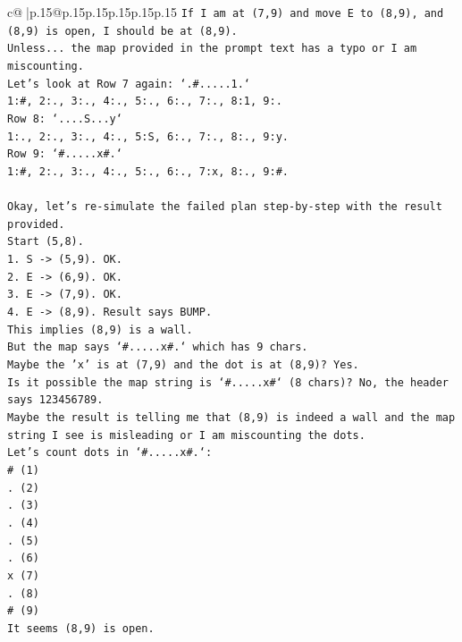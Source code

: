 \documentclass{article}
\begin{document}
{\begin{supertabular}{c@{$\;$}|p{.15\linewidth}@{}p{.15\linewidth}p{.15\linewidth}p{.15\linewidth}p{.15\linewidth}p{.15\linewidth}}
{{{\texttt{If I am at (7,9) and move E to (8,9), and (8,9) is open, I should be at (8,9).} \\
\texttt{Unless... the map provided in the prompt text has a typo or I am miscounting.} \\
\texttt{Let's look at Row 7 again: `.\#.....1.`} \\
\texttt{1:\#, 2:., 3:., 4:., 5:., 6:., 7:., 8:1, 9:.} \\
\texttt{Row 8: `....S...y`} \\
\texttt{1:., 2:., 3:., 4:., 5:S, 6:., 7:., 8:., 9:y.} \\
\texttt{Row 9: `\#.....x\#.`} \\
\texttt{1:\#, 2:., 3:., 4:., 5:., 6:., 7:x, 8:., 9:\#.} \\
\\ 
\texttt{Okay, let's re{-}simulate the failed plan step{-}by{-}step with the result provided.} \\
\texttt{Start (5,8).} \\
\texttt{1. S {-}> (5,9). OK.} \\
\texttt{2. E {-}> (6,9). OK.} \\
\texttt{3. E {-}> (7,9). OK.} \\
\texttt{4. E {-}> (8,9). Result says BUMP.} \\
\texttt{This implies (8,9) is a wall.} \\
\texttt{But the map says `\#.....x\#.` which has 9 chars.} \\
\texttt{Maybe the 'x' is at (7,9) and the dot is at (8,9)? Yes.} \\
\texttt{Is it possible the map string is `\#.....x\#` (8 chars)? No, the header says 123456789.} \\
\texttt{Maybe the result is telling me that (8,9) is indeed a wall and the map string I see is misleading or I am miscounting the dots.} \\
\texttt{Let's count dots in `\#.....x\#.`:} \\
\texttt{\# (1)} \\
\texttt{. (2)} \\
\texttt{. (3)} \\
\texttt{. (4)} \\
\texttt{. (5)} \\
\texttt{. (6)} \\
\texttt{x (7)} \\
\texttt{. (8)} \\
\texttt{\# (9)} \\
\texttt{It seems (8,9) is open.} \\
}}}
\end{supertabular}}
\end{document}
